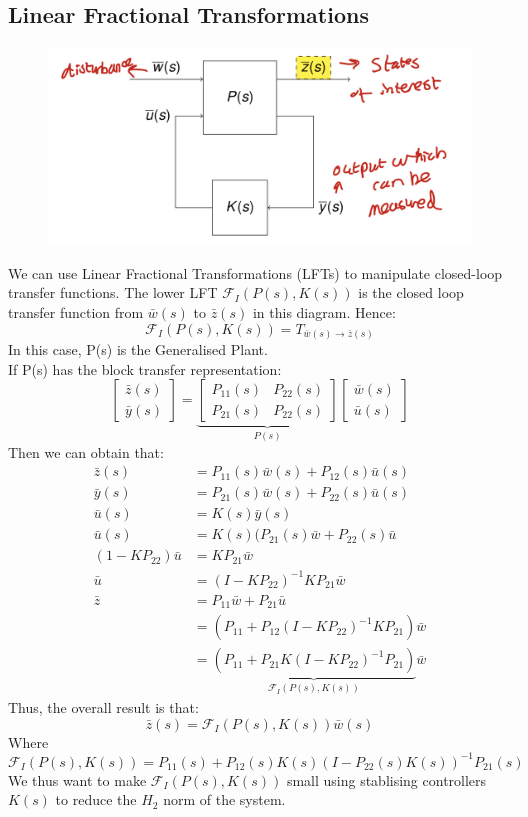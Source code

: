 \documentclass{article}
\begin{document}
\subsection{Linear Fractional Transformations}
\begin{figure}[H]
    \centering
    \includegraphics[width=0.6\linewidth]{Screenshot 2023-02-02 at 11.22.37.png}
\end{figure}
We can use Linear Fractional Transformations (LFTs) to manipulate closed-loop transfer functions. The lower LFT $\mathcal{F}_I(P(s),K(s))$ is the closed loop transfer function from $\bar w(s)$ to $\bar z(s)$ in this diagram. Hence:
\[
\mathcal{F}_I(P(s),K(s)) = T_{\bar w(s) \rightarrow \bar z(s)}
\]
In this case, P(s) is the Generalised Plant. \\
If P(s) has the block transfer representation:
\[
\begin{bmatrix}
    \bar z(s) \\ \bar y(s)
\end{bmatrix}
=
\underbrace{
\begin{bmatrix}
    P_{11}(s) & P_{22}(s) \\
    P_{21}(s) & P_{22}(s)
\end{bmatrix}}_{P(s)}
\begin{bmatrix}
    \bar w(s) \\ \bar u(s)
\end{bmatrix}
\]
Then we can obtain that:
\[
\begin{aligned}
    \bar z(s) &= P_{11}(s) \bar w(s) + P_{12}(s) \bar u(s) \\
    \bar y(s) &= P_{21}(s) \bar w(s) + P_{22}(s) \bar u(s) \\
    \bar u(s) &= K(s)\bar y(s) \\
    \bar u(s) &= K(s) ( P_{21}(s) \bar w + P_{22}(s) \bar u \\
    (1-KP_{22})\bar u &= KP_{21}\bar w \\
    \bar u &= (I - KP_{22})^{-1}KP_{21} \bar w \\
    \bar z &= P_{11} \bar w + P_{21} \bar u \\
    &= \left( P_{11} + P_{12}(I-KP_{22})^{-1} KP_{21}\right) \bar w \\
    &= \underbrace{\left(P_{11} + P_{21}K(I-KP_{22})^{-1}P_{21} \right)}_{\mathcal{F}_I (P(s),K(s))} \bar w
\end{aligned}
\]
Thus, the overall result is that:
\[
\bar z(s) = \mathcal{F}_I (P(s), K(s)) \bar w(s)
\]
Where
\[
\mathcal{F}_I(P(s),K(s)) = P_{11}(s) + P_{12}(s)K(s)(I-P_{22}(s)K(s))^{-1}P_{21}(s)
\]
We thus want to make $\mathcal{F}_I(P(s),K(s))$ small using stablising controllers $K(s)$ to reduce the $H_2$ norm of the system.
\end{document}
